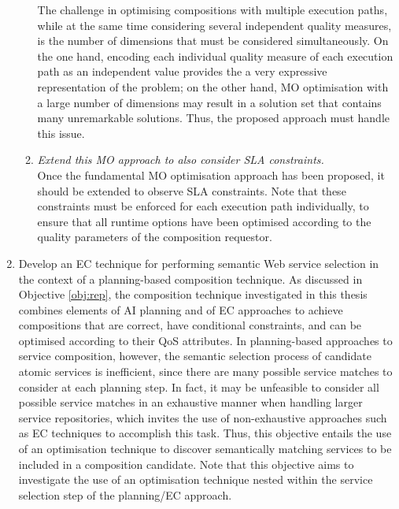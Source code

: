 \begin{enumerate}
\begin{enumerate}
    
    The challenge in optimising compositions with multiple execution paths, while at the same time considering several independent quality measures, is the number of dimensions that must be considered simultaneously. On the one hand, encoding each individual quality measure of each execution path as an independent value provides the a very expressive representation of the problem; on the other hand, MO optimisation with a large number of dimensions may result in a solution set that contains many unremarkable solutions. Thus, the proposed approach must handle this issue.
    \item \label{obj:sla-mo} \emph{Extend this MO approach to also consider SLA constraints.}\\
    Once the fundamental MO optimisation approach has been proposed, it should be extended to observe SLA constraints. Note that these constraints must be enforced for each execution path individually, to ensure that all runtime options have been optimised according to the quality parameters of the composition requestor.
   \end{enumerate}
 
 \item \label{obj:semantic} Develop an EC technique for performing semantic Web service selection in the context of a planning-based composition technique. As discussed in Objective \ref{obj:rep}, the composition technique investigated in this thesis combines elements of AI planning and of EC approaches to achieve compositions that are correct, have conditional constraints, and can be optimised according to their QoS attributes. In planning-based approaches to service composition, however, the semantic selection process of candidate atomic services is inefficient, since there are many possible service matches to consider at each planning step. In fact, it may be unfeasible to consider all possible service matches in an exhaustive manner when handling larger service repositories, which invites the use of non-exhaustive approaches such as EC techniques to accomplish this task. Thus, this objective entails the use of an optimisation technique to discover semantically matching services to be included in a composition candidate. Note that this objective aims to investigate the use of an optimisation technique nested within the service selection step of the planning/EC approach.
 

\end{enumerate}
